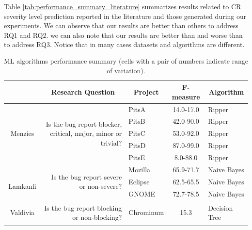 Table \ref{tab:performance_summary_literature} summarizes results related to CR severity level prediction reported in the literature and those generated during our experiments. We can observe that our results are better than others \cite{Lamkanfi2010, ValdiviaGarcia2014} to address RQ1 and RQ2. we can also note that our results are better than \cite{Tian2012} and worse than \cite{Menzies2008} to address RQ3. Notice that in many cases datasets and algorithms are different. 
\begin{table}[!h]
  \centering
  \renewcommand{\arraystretch}{1.7}
  \caption{ML algorithms performance summary (cells with a pair of numbers indicate range of variation).}
    \begin{tabular}{|c|p{2.1cm}|p{1.3cm}|c|p{1.8cm}|}
\cline{2-5}    \multicolumn{1}{r|}{} & \multicolumn{1}{c|}{Research Question} & \multicolumn{1}{c|}{Project} & F-measure & \multicolumn{1}{c|}{Algorithm} \\
    \hline
    \multirow{5}[10]{*}{\begin{turn}{88}\scriptsize{Menzies\cite{Menzies2008}}\end{turn}} & \multicolumn{1}{r|}{\multirow{5}[10]{2.1cm}{Is the bug report blocker, critical, major, minor or trivial?}} & PitsA & 14.0-17.0 & Ripper \\
\cline{3-5}          &       & PitsB & 42.0-90.0 & Ripper \\
\cline{3-5}          &       & PitsC & 53.0-92.0 & Ripper \\
\cline{3-5}          &       & PitsD & 87.0-99.0 & Ripper \\
\cline{3-5}          &       & PitsE & 8.0-88.0 & Ripper \\
    \hline
    \multirow{3}[6]{*}{\begin{turn}{88} $\quad$\scriptsize{Lamkanfi\cite{Lamkanfi2010}}\end{turn}} & \multicolumn{1}{r|}{\multirow{3}[6]{2.1cm}{Is the bug report severe or non-severe?}} & Mozilla & 65.9-71.7 & Naive Bayes \\
\cline{3-5}          &       & Eclipse & 62.5-65.5 & Naive Bayes \\
\cline{3-5}          &       & GNOME & 72.7-78.5 & Naive Bayes \\
    \hline
    \multirow{6}[12]{*}{\begin{turn}{88}\scriptsize{Valdivia\cite{ValdiviaGarcia2014}}\end{turn}} & \multicolumn{1}{r|}{\multirow{6}[12]{2.1cm}{Is the bug report blocking or non-blocking?}} & Chrominum & 15.3  & Decision Tree \\

\end{tabular}
\end{table}
